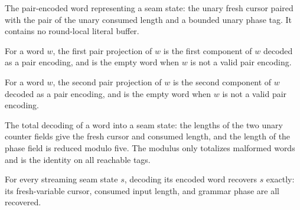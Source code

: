 \begin{definition}
\label{Complexity.satStreamWord}
\leanok
{}
The pair-encoded word representing a seam state: the unary fresh cursor paired
with the pair of the unary consumed length and a bounded unary phase tag. It
contains no round-local literal buffer.
\end{definition}

\begin{definition}
\label{Complexity.satStreamFst}
\leanok
{}
For a word $w$, the first pair projection of $w$ is the first component of $w$
decoded as a pair encoding, and is the empty word when $w$ is not a valid pair
encoding.
\end{definition}

\begin{definition}
\label{Complexity.satStreamSnd}
\leanok
{}
For a word $w$, the second pair projection of $w$ is the second component of $w$
decoded as a pair encoding, and is the empty word when $w$ is not a valid pair
encoding.
\end{definition}

\begin{definition}
\label{Complexity.satStreamRead}
\leanok
{}
The total decoding of a word into a seam state: the lengths of the two unary
counter fields give the fresh cursor and consumed length, and the length of the
phase field is reduced modulo five. The modulus only totalizes malformed words and
is the identity on all reachable tags.
\end{definition}

\begin{lemma}
\label{Complexity.satStreamRead_word}
\leanok
{}
For every streaming seam state $s$, decoding its encoded word recovers $s$ exactly: its
fresh-variable cursor, consumed input length, and grammar phase are all recovered.
\end{lemma}

